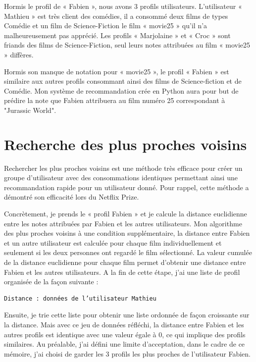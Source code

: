 Hormis le profil de « Fabien », nous avons 3 profils utilisateurs. L’utilisateur « Mathieu » est très client des comédies, il a consommé deux films de types Comédie et un film de Science-Fiction le film « movie25 » qu’il n’a malheureusement pas apprécié.  Les profils « Marjolaine » et « Croc » sont friands des films de Science-Fiction, seul leurs notes attribuées au film « movie25 » diffères. 

\vspace{5mm}

Hormis son manque de notation pour « movie25 », le profil  « Fabien » est similaire aux autres profils consommant ainsi des films de Science-fiction et de Comédie. Mon système de recommandation crée en Python aura pour but de prédire la note que Fabien attribuera au film numéro 25 correspondant à "Jurassic World". 


\section{Recherche des plus proches voisins}

Rechercher les plus proches voisins est une méthode très efficace pour créer un groupe d’utilisateur avec des consommations identiques permettant ainsi une recommandation rapide pour un utilisateur donné. Pour rappel, cette méthode a démontré son efficacité lors du Netflix Prize. 

\vspace{5mm}

Concrètement, je prends le  « profil Fabien » et je calcule la distance euclidienne entre les notes attribuées par Fabien et les autres utilisateurs. Mon algorithme des plus proches voisins à une condition supplémentaire, la distance entre Fabien et un autre utilisateur est calculée pour chaque film individuellement et seulement si les deux personnes ont regardé le film sélectionné. La valeur cumulée de la distance euclidienne pour chaque film permet d’obtenir une distance entre Fabien et les autres utilisateurs.  A la fin de cette étape, j’ai une liste de profil organisée de la façon suivante : 

\begin{verbatim}
Distance : données de l’utilisateur Mathieu 
\end{verbatim}

Ensuite, je trie cette liste pour obtenir une liste ordonnée de façon croissante sur la distance. Mais avec ce jeu de données réfléchi, la distance entre Fabien et les autres profils est identique avec une valeur égale à 0, ce qui implique des profils similaires. Au préalable, j’ai défini une limite d’acceptation, dans le cadre de ce mémoire, j’ai choisi de garder les 3 profils les plus proches de l’utilisateur Fabien. 

